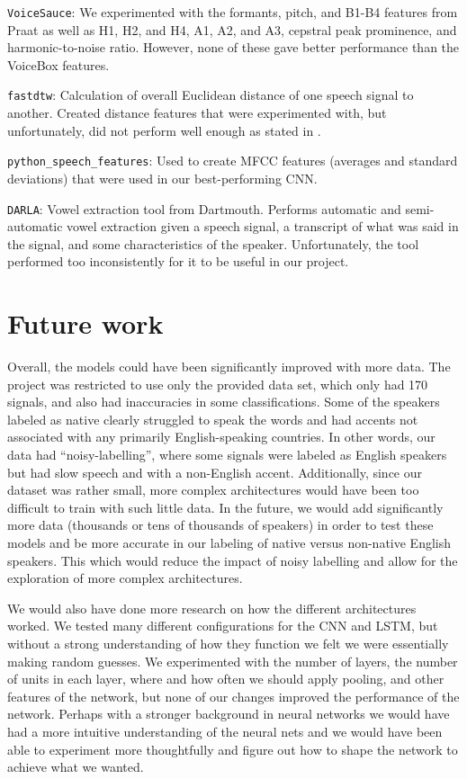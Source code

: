 \documentclass{article}
\begin{document}
\texttt{VoiceSauce}: We experimented with the formants, pitch, and B1-B4 features from Praat as well as H1, H2, and H4, A1, A2, and A3, cepstral peak prominence, and harmonic-to-noise ratio.
However, none of these gave better performance than the VoiceBox features.

\texttt{fastdtw}: Calculation of overall Euclidean distance of one speech signal to another.
Created distance features that were experimented with, but unfortunately, did not perform well enough as stated in .

\texttt{python\_speech\_features}: Used to create MFCC features (averages and standard deviations) that were used in our best-performing CNN.

\texttt{DARLA}: Vowel extraction tool from Dartmouth.
Performs automatic and semi-automatic vowel extraction given a speech signal, a transcript of what was said in the signal, and some characteristics of the speaker.
Unfortunately, the tool performed too inconsistently for it to be useful in our project.

\section{Future work}
\label{sec:future}

Overall, the models could have been significantly improved with more data.
The project was restricted to use only the provided data set, which only had 170 signals, and also had inaccuracies in some classifications.
Some of the speakers labeled as native clearly struggled to speak the words and had accents not associated with any primarily English-speaking countries.
In other words, our data had “noisy-labelling”, where some signals were labeled as English speakers but had slow speech and with a non-English accent.
Additionally, since our dataset was rather small, more complex architectures would have been too difficult to train with such little data.
In the future, we would add significantly more data (thousands or tens of thousands of speakers) in order to test these models  and be more accurate in our labeling of native versus non-native English speakers.
This which would reduce the impact of noisy labelling and allow for the exploration of more complex architectures.

We would also have done more research on how the different architectures worked.
We tested many different configurations for the CNN and LSTM, but without a strong understanding of how they function we felt we were essentially making random guesses.
We experimented with the number of layers, the number of units in each layer, where and how often we should apply pooling, and other features of the network, but none of our changes improved the performance of the network.
Perhaps with a stronger background in neural networks we would have had a more intuitive understanding of the neural nets and we would have been able to experiment more thoughtfully and figure out how to shape the network to achieve what we wanted.
\end{document}

